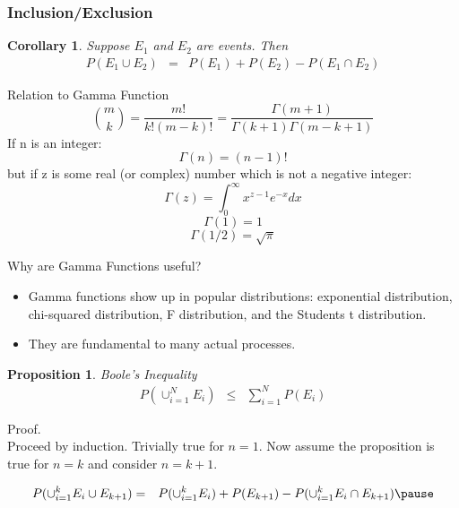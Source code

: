 \documentclass[handout]{beamer}
\newtheorem{prop}{Proposition}
\newtheorem{cor}{Corollary}
\numberwithin{equation}{section}
\begin{document}
\begin{frame}
\frametitle{Inclusion/Exclusion}


\begin{cor}
Suppose $E_{1}$ and $E_{2} $ are events.  Then 
\begin{eqnarray}
P(E_{1} \cup E_{2} ) & = & P(E_{1} ) + P(E_{2} ) - P(E_{1} \cap E_{2} ) \nonumber 
\end{eqnarray}
\end{cor}


\end{frame}


\begin{frame}{Relation to Gamma Function}
$${{m}\choose{k}}=\frac{m!}{k!(m-k)!}=\frac{\Gamma(m+1)}{\Gamma(k+1)\Gamma(m-k+1)}$$\pause
If n is an integer:
$$\Gamma(n)=(n-1)!$$\pause
but if z is some real (or complex) number which is not a negative integer: \pause
$$\Gamma(z)=\int_0^\infty x^{z-1}e^{-x}dx$$\pause
$$\Gamma(1)=1$$\pause
$$\Gamma(1/2)=\sqrt{\pi}$$

\end{frame}

\begin{frame}{Why are Gamma Functions useful?}
\begin{itemize}
\item Gamma functions show up in popular distributions: exponential distribution, chi-squared distribution, F distribution, and the Students t distribution.
\item They are fundamental to many actual processes.
\end{itemize}

\end{frame}



\begin{frame}

\begin{prop}
\alert{Boole's Inequality}
\begin{eqnarray}
P(\cup_{i=1}^{N} E_{i}) & \leq & \sum_{i=1}^{N} P(E_{i} ) \nonumber 
\end{eqnarray}

\end{prop}
\pause 
Proof. \pause \\
Proceed by induction.  Trivially true for $n =1 $.  Now assume the proposition is true for $n = k$ and consider $n = k + 1$.   \pause 

\begin{eqnarray}
P(\cup_{i=1}^{k} E_i \cup E_{k + 1} )  & = & P(\cup_{i=1}^{k} E_i) + P(E_{k + 1} ) - P(\cup_{i=1}^{k} E_i \cap E_{k + 1})\nonumber  \pause 
\end{eqnarray}



\end{frame}
\end{document}
